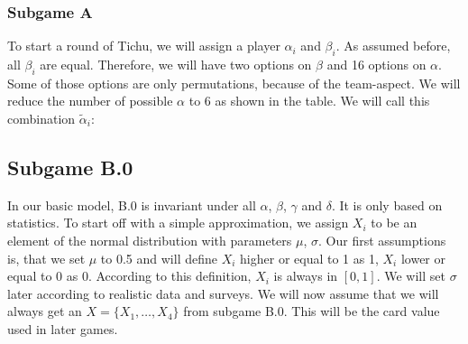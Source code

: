 \subsubsection{Subgame A}
To start a round of Tichu, we will assign a player $\alpha_i$ and $\beta_i$. As assumed before, all $\beta_i$ are equal. Therefore, we will have two options on $\beta$ and 16 options on $\alpha$. Some of those options are only permutations, because of the team-aspect. We will reduce the number of possible $\alpha$ to 6 as shown in the table. We will call this combination $\tilde{\alpha}_i$: \\
\begin{table}[h]
\end{table}
\begin{table}[h]
\end{table}
\subsection{Subgame B.0}
In our basic model, B.0 is invariant under all $\alpha$, $\beta$, $\gamma$ and $\delta$. It is only based on statistics. 
To start off with a simple approximation, we assign $X_i$ to be an element of the normal distribution with parameters $\mu$, $\sigma$.
Our first assumptions is, that we set $\mu$ to 0.5 and will define $X_i$ higher or equal to 1 as 1,  $X_i$ lower or equal to 0 as 0.   
According to this definition, $X_i$ is always in $[0,1]$. We will set $\sigma$ later according to realistic data and surveys. We will now assume that we will always get an $X = \{X_1, …, X_4\}$ from subgame B.0. This will be the card value used in later games. 

